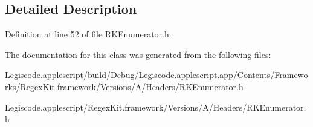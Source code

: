 \subsection{Detailed Description}


Definition at line 52 of file R\-K\-Enumerator.\-h.



The documentation for this class was generated from the following files\-:\begin{DoxyCompactItemize}
\item 
Legiscode.\-applescript/build/\-Debug/\-Legiscode.\-applescript.\-app/\-Contents/\-Frameworks/\-Regex\-Kit.\-framework/\-Versions/\-A/\-Headers/R\-K\-Enumerator.\-h\item 
Legiscode.\-applescript/\-Regex\-Kit.\-framework/\-Versions/\-A/\-Headers/R\-K\-Enumerator.\-h\end{DoxyCompactItemize}
